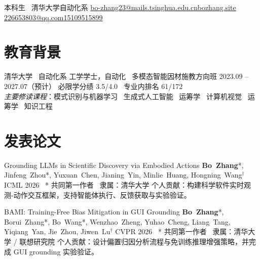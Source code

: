 \documentclass[10pt]{article}
\newcommand{\cvcontrib}[1]{%
  {\color{muted}\fontsize{9.5}{12}\selectfont 个人贡献：#1}\par\vspace{0.05em}%
}
\begin{document}
%
  {}%
  {本科生 \cvsep\ 清华大学自动化系}%
  {%
    \cvicon{\faEnvelope[regular]}\href{mailto:bo-zhang23@mails.tsinghua.edu.cn}{bo-zhang23@mails.tsinghua.edu.cn}\quad\cvicon{\faGlobe}\href{https://bozhang.site}{bozhang.site}\\%
    \cvicon{\faGithub}\href{mailto:226653803@qq.com}{226653803@qq.com}\quad\cvicon{\faPhone}\href{tel:+8615109515899}{15109515899}%
  }

\section{教育背景}

\cventry%
  {清华大学 \cvsep\ 自动化系}%
  {工学学士，自动化 \cvsep\ 多模态智能因材施教方向班}%
  {2023.09 -- 2027.07（预计）}%
  {%
    必限学分绩 3.5/4.0 \cvsep\ 专业内排名 61/172 \\
    {\itshape 主要修读课程}：模式识别与机器学习 \cvsep\ 生成式人工智能 \cvsep\ 运筹学 \cvsep\ 计算机视觉 \cvsep\ 运筹学 \cvsep\ 知识工程%
  }

\section{发表论文}


\cvpub%
  {Grounding {LLMs} in Scientific Discovery via Embodied Actions}%
  {\textbf{Bo~Zhang}*, Jinfeng~Zhou*, Yuxuan~Chen, Jianing~Yin, Minlie~Huang, Hongning~Wang$^\dagger$}%
  {ICML 2026 \cvsep\ {*} 共同第一作者 \cvsep\ 隶属：清华大学}%
  {}
\cvcontrib{构建科学软件实时观测-动作交互框架，支持智能体执行、反馈获取与实验验证。}


\cvpub%
  {{BAMI}: Training-Free Bias Mitigation in {GUI} Grounding}%
  {\textbf{Bo~Zhang}*, Borui~Zhang*, Bo~Wang*, Wenzhao~Zheng, Yuhao~Cheng, Liang~Tang, Yiqiang~Yan, Jie~Zhou, Jiwen~Lu$^\dagger$}%
  {CVPR 2026 \cvsep\ {*} 共同第一作者 \cvsep\ 隶属：清华大学 / 联想研究院}%
  {}
\cvcontrib{设计偏置归因分析流程与免训练推理增强策略，并完成 GUI grounding 实验验证。}

\end{document}
